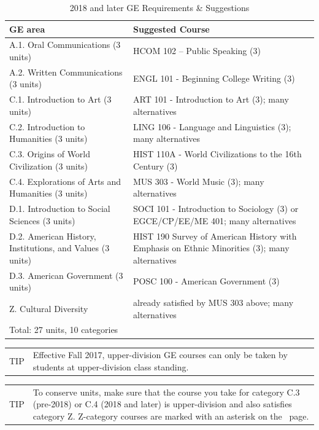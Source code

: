 \documentclass{book}
\newenvironment{tip}{
  \tcolorbox \begin{tabular}{m{.5in} m{5.25in}}
    \Large{TIP} &
}{
  \end{tabular} \endtcolorbox
}
\begin{document}
\begin{table}
\caption{2018 and later GE Requirements \& Suggestions}
\begin{center}
\begin{tabular}{| p{3in} | p{3in} |} \hline
  \textbf{GE area} & \textbf{Suggested Course} \\ \hline
  A.1. Oral Communications (3 units) & HCOM 102 – Public Speaking (3) \\ \hline
  A.2. Written Communications (3 units) & ENGL 101 - Beginning College Writing (3) \\ \hline
  C.1. Introduction to Art (3 units) & ART 101 - Introduction to Art (3); many alternatives \\ \hline
  C.2. Introduction to Humanities (3 units) & LING 106 - Language and Linguistics (3); many alternatives \\ \hline
  C.3. Origins of World Civilization (3 units) & HIST 110A - World Civilizations to the 16th Century (3) \\ \hline
  C.4. Explorations of Arts and Humanities (3 units) & MUS 303 - World Music (3); many alternatives \\ \hline
  D.1. Introduction to Social Sciences (3 units) & SOCI 101 - Introduction to Sociology (3) or EGCE/CP/EE/ME 401; many alternatives \\ \hline
  D.2. American History, Institutions, and Values (3 units) & HIST 190 Survey of American History with Emphasis on Ethnic Minorities (3); many alternatives \\ \hline
  D.3. American Government (3 units) & POSC 100 - American Government (3) \\ \hline
  Z. Cultural Diversity & already satisfied by MUS 303 above; many alternatives \\ \hline
  \multicolumn{2}{|l|}{Total: 27 units, 10 categories} \\ \hline
\end{tabular}
\end{center}
\end{table}

\begin{tip}
Effective Fall 2017, upper-division GE courses can only be taken by
students at upper-division class standing.
\end{tip}

\begin{tip}
To conserve units, make sure that the course you take for category C.3
(pre-2018) or C.4 (2018 and later) is upper-division and also
satisfies category Z. Z-category courses are marked with an asterisk
on the \gecourselist~page.
\end{tip}
\end{document}
